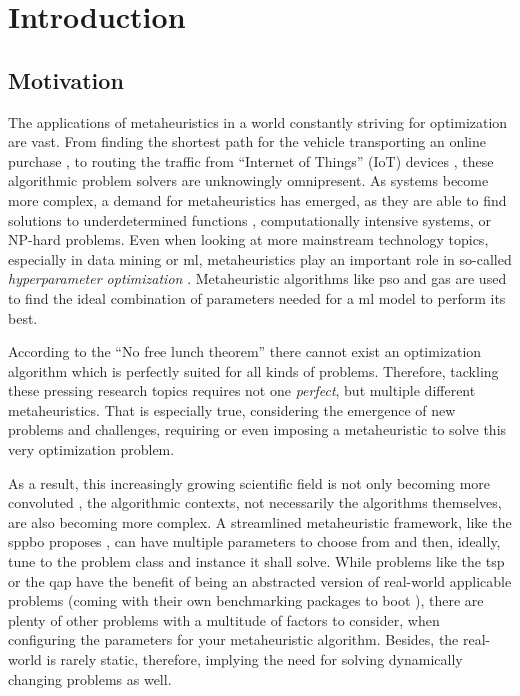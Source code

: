 
\chapter{Introduction}
\label{chap:introduction}

\section{Motivation}

The applications of metaheuristics in a world constantly striving for optimization are vast. From finding the shortest path for the vehicle transporting an online purchase \cite{vogel2011flexible}, to routing the traffic from \enquote{Internet of Things} (IoT) devices \cite{sharma2022systematic}, these algorithmic problem solvers are unknowingly omnipresent. As systems become more complex, a demand for metaheuristics has emerged, as they are able to find solutions to underdetermined functions \cite{jamisola2009using}, computationally intensive systems, or NP-hard problems. Even when looking at more mainstream technology topics, especially in data mining or \gls{ml}, metaheuristics play an important role in so-called \textit{hyperparameter optimization} \cite{yang2020hyperparameter}. Metaheuristic algorithms like \gls{pso} and \glspl{ga} are used to find the ideal combination of parameters needed for a \gls{ml} model to perform its best.

According to the \enquote{No free lunch theorem} \cite{wolpert1997no} there cannot exist an optimization algorithm which is perfectly suited for all kinds of problems. Therefore, tackling these pressing research topics requires not one \textit{perfect}, but multiple different metaheuristics. That is especially true, considering the emergence of new problems and challenges, requiring or even imposing a metaheuristic to solve this very optimization problem.

 As a result, this increasingly growing scientific field is not only becoming more convoluted \cite{sorensen2018history}, the algorithmic contexts, not necessarily the algorithms themselves, are also becoming more complex. A streamlined metaheuristic framework, like the \gls{sppbo} proposes \cite{lin2015simple}, can have multiple parameters to choose from and then, ideally, tune to the problem class and instance it shall solve. While problems like the \gls{tsp} or the \gls{qap} have the benefit of being an abstracted version of real-world applicable problems (coming with their own benchmarking packages to boot \cite{reinelt1991tsplib, burkard1997qaplib}), there are plenty of other problems with a multitude of factors to consider, when configuring the parameters for your metaheuristic algorithm. Besides, the real-world is rarely static, therefore, implying the need for solving dynamically changing problems as well.



